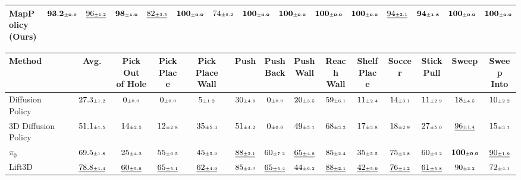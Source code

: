 \begin{table}[t]
\begin{adjustbox}{max width=\textwidth}
\begin{tabular}{l|c|ccccccccccccc}
\midrule
MapPolicy (Ours) & $\mathbf{93.2\std{0.9}}$ & $\underline{96\std{1.2}}$ & $\mathbf{98\std{1.0}}$ & $\underline{82\std{3.5}}$ & $\mathbf{100\std{0.0}}$ & $74\std{6.2}$ & $\mathbf{100\std{0.0}}$ & $\mathbf{100\std{0.0}}$ & $\mathbf{100\std{0.0}}$ & $\mathbf{100\std{0.0}}$ & $\underline{94\std{2.1}}$ & $\mathbf{94\std{1.8}}$ & $\mathbf{100\std{0.0}}$ & $\mathbf{100\std{0.0}}$ \\
\bottomrule
\end{tabular}
\end{adjustbox}


\begin{adjustbox}{max width=\textwidth}
\begin{tabular}{l|c|cccccccccccc}
\toprule
\rowcolor{tablehead}
Method & Avg. &
\shortstack{Pick Out\\of Hole} &
\shortstack{Pick\\Place} &
\shortstack{Pick Place\\Wall} &
Push &
\shortstack{Push\\Back} &
\shortstack{Push\\Wall} &
\shortstack{Reach\\Wall} &
\shortstack{Shelf\\Place} &
Soccer &
\shortstack{Stick\\Pull} &
Sweep &
\shortstack{Sweep\\Into} \\
\midrule
Diffusion Policy~\cite{chi2024diffusionpolicy} & $27.3\std{1.2}$ & $0\std{0.0}$ & $0\std{0.0}$ & $5\std{1.2}$ & $30\std{4.8}$ & $0\std{0.0}$ & $20\std{3.5}$ & $59\std{6.1}$ & $11\std{2.4}$ & $14\std{3.1}$ & $11\std{2.9}$ & $18\std{4.5}$ & $10\std{2.2}$ \\
3D Diffusion Policy~\cite{Ze2024DP3} & $51.1\std{1.5}$ & $14\std{2.5}$ & $12\std{2.8}$ & $35\std{5.4}$ & $51\std{4.2}$ & $0\std{0.0}$ & $49\std{5.1}$ & $68\std{3.3}$ & $17\std{3.8}$ & $18\std{2.9}$ & $27\std{5.0}$ & $\underline{96\std{1.4}}$ & $15\std{3.1}$ \\
$\pi_0$~\cite{black2026pi0visionlanguageactionflowmodel} & $69.5\std{1.8}$ & $25\std{4.2}$ & $55\std{6.5}$ & $45\std{5.9}$ & $\underline{88\std{2.1}}$ & $60\std{7.2}$ & $\underline{65\std{4.8}}$ & $85\std{2.4}$ & $35\std{5.5}$ & $75\std{3.8}$ & $60\std{6.2}$ & $\mathbf{100\std{0.0}}$ & $\underline{90\std{1.9}}$ \\
Lift3D~\cite{Jia_2025_CVPR} & $\underline{78.8\std{1.4}}$ & $\underline{60\std{5.8}}$ & $\underline{65\std{5.1}}$ & $\underline{62\std{4.9}}$ & $85\std{3.0}$ & $\underline{65\std{5.4}}$ & $44\std{6.2}$ & $\underline{88\std{2.1}}$ & $\underline{42\std{5.9}}$ & $\underline{76\std{4.2}}$ & $\underline{61\std{5.8}}$ & $90\std{3.2}$ & $72\std{4.1}$ \\

\end{tabular}
\end{adjustbox}
\end{table}

